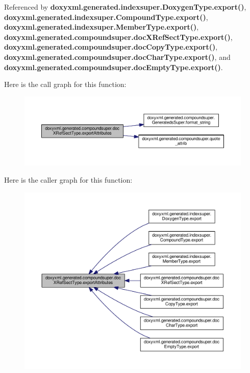 Referenced by {\bf doxyxml.\+generated.\+indexsuper.\+Doxygen\+Type.\+export()}, {\bf doxyxml.\+generated.\+indexsuper.\+Compound\+Type.\+export()}, {\bf doxyxml.\+generated.\+indexsuper.\+Member\+Type.\+export()}, {\bf doxyxml.\+generated.\+compoundsuper.\+doc\+X\+Ref\+Sect\+Type.\+export()}, {\bf doxyxml.\+generated.\+compoundsuper.\+doc\+Copy\+Type.\+export()}, {\bf doxyxml.\+generated.\+compoundsuper.\+doc\+Char\+Type.\+export()}, and {\bf doxyxml.\+generated.\+compoundsuper.\+doc\+Empty\+Type.\+export()}.



Here is the call graph for this function\+:
\nopagebreak
\begin{figure}[H]
\begin{center}
\leavevmode
\includegraphics[width=350pt]{d3/d61/classdoxyxml_1_1generated_1_1compoundsuper_1_1docXRefSectType_a2764aab833181ab9656cf585616b9337_cgraph}
\end{center}
\end{figure}




Here is the caller graph for this function\+:
\nopagebreak
\begin{figure}[H]
\begin{center}
\leavevmode
\includegraphics[width=350pt]{d3/d61/classdoxyxml_1_1generated_1_1compoundsuper_1_1docXRefSectType_a2764aab833181ab9656cf585616b9337_icgraph}
\end{center}
\end{figure}


